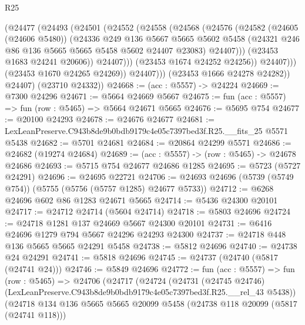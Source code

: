\begin{lexlean}{R25}
\begin{coremodule}
                      (@24477
                        (@24493
                          (@24501
                            (@24552
                              (@24558
                                (@24568
                                  (@24576
                                    (@24582
                                      (@24605 (@24606 @5480))
                                      (@24336
                                        @249
                                        @136
                                        @5667
                                        @5665
                                        @5602
                                        @5458
                                        (@24321 @246 @86 @136 @5665 @5665 @5458 @5602 @24407 @23083)
                                        @24407)))
                                  (@23453 @1683 @24241 @20606))
                                @24407)))
                          (@23453 @1674 @24252 @24256))
                        @24407)))
                  (@23453 @1670 @24265 @24269))
                @24407)))
          (@23453 @1666 @24278 @24282))
        @24407)
      (@23710 @24332))
@24668 := (acc : @5557) -> @24224
@24669 := @7300 @24296
@24671 := @5664 @24669 @5667
@24675 := fun (acc : @5557) => fun (row : @5465) => @5664 @24671 @5665
@24676 := @5695 @754
@24677 := @20100 @24293
@24678 := @24676 @24677
@24681 := LexLeanPreserve.C943b8de9b0bdb9179c4e05c7397bed3f.R25.__fits_25 @5571 @5438
@24682 := @5701 @24681
@24684 := @20864 @24299 @5571
@24686 := @24682 (@19274 @24684)
@24689 := (acc : @5557) -> (row : @5465) -> @24678 @24686
@24693 := @5715 @754 @24677 @24686 @1285
@24695 := @5723 (@5727 @24291)
@24696 := @24695 @22721
@24706 := @24693 @24696 (@5739 (@5749 @754)) (@5755 (@5756 (@5757 @1285) @24677 @5733))
@24712 := @6268 @24696 @602 @86 @1283 @24671 @5665
@24714 := @5436 @24300 @20101
@24717 := @24712 @24714 (@5604 @24714)
@24718 := @5803 @24696
@24724 := @24718 @1281 @137 @24669 @5667 @24300 @20101
@24731 := @6416 @24696 @1279 @794 @5667 @24296 @24293 @24300
@24737 := @24718 @448 @136 @5665 @5665 @24291 @5458
@24738 := @5812 @24696
@24740 := @24738 @24 @24291
@24741 := @5818 @24696
@24745 := @24737 (@24740 (@5817 (@24741 @24)))
@24746 := @5849 @24696
@24772 := fun (acc : @5557) =>
  fun (row : @5465) =>
  @24706
    (@24717
      (@24724
        (@24731
          (@24745 @24746)
          (LexLeanPreserve.C943b8de9b0bdb9179c4e05c7397bed3f.R25.__rel_43 @5438))
        (@24718
          @134
          @136
          @5665
          @5665
          @20099
          @5458
          (@24738 @118 @20099 (@5817 (@24741 @118)))

\end{coremodule}
\end{lexlean}
